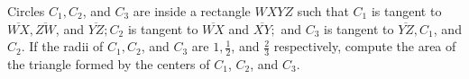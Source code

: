 Circles $C_{1}, C_{2}$, and $C_{3}$ are inside a rectangle $W X Y Z$ such that $C_{1}$ is tangent to $\overline{W X}, \overline{Z W}$, and $\overline{Y Z} ; C_{2}$ is tangent to $\overline{W X}$ and $\overline{X Y} ;$ and $C_{3}$ is tangent to $\overline{Y Z}, C_{1}$, and $C_{2}$. If the radii of $C_{1}, C_{2}$, and $C_{3}$ are $1, \frac{1}{2}$, and $\frac{2}{3}$ respectively, compute the area of the triangle formed by the centers of $C_{1}$, $C_{2}$, and $C_{3}$.